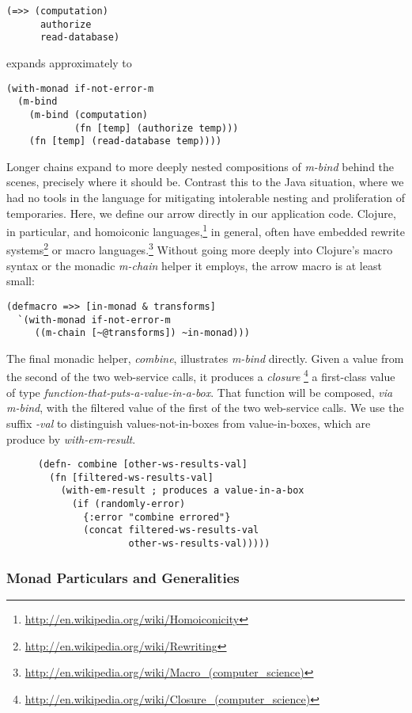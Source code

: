 \documentclass[11pt]{article}
\begin{document}
\begin{verbatim}
(=>> (computation)
      authorize
      read-database)
\end{verbatim}
expands approximately to
\begin{verbatim}
(with-monad if-not-error-m
  (m-bind
    (m-bind (computation)
            (fn [temp] (authorize temp)))
    (fn [temp] (read-database temp))))
\end{verbatim}
Longer chains expand to more deeply nested compositions of \emph{m-bind}
behind the scenes, precisely where it should be. Contrast this to
the Java situation, where we had no tools in the language for
mitigating intolerable nesting and proliferation of temporaries.
Here, we define our arrow directly in our application code.
Clojure, in particular, and homoiconic
languages,\footnote{\url{http://en.wikipedia.org/wiki/Homoiconicity}} in
general, often have embedded rewrite
systems\footnote{\url{http://en.wikipedia.org/wiki/Rewriting}} or macro
languages.\footnote{\url{http://en.wikipedia.org/wiki/Macro_(computer_science)}}
Without going more deeply into Clojure's macro syntax or the
monadic \emph{m-chain} helper it employs, the arrow macro is at least
small:
\begin{verbatim}
(defmacro =>> [in-monad & transforms]
  `(with-monad if-not-error-m
     ((m-chain [~@transforms]) ~in-monad)))
\end{verbatim}

The final monadic helper, \emph{combine}, illustrates \emph{m-bind} directly.
Given a value from the second of the two web-service calls, it
produces a \emph{closure}
\footnote{\url{http://en.wikipedia.org/wiki/Closure_(computer_science)}}
a first-class value of type
\emph{function-that-puts-a-value-in-a-box}. That function
will be composed, \emph{via} \emph{m-bind}, with the filtered value of the first
of the two web-service calls. We use the suffix \emph{-val} to
distinguish values-not-in-boxes from value-in-boxes, which are
produce by \emph{with-em-result}.
\begin{figure}[H]
\label{monadic-helpers-2}
\begin{verbatim}
(defn- combine [other-ws-results-val]
  (fn [filtered-ws-results-val]
    (with-em-result ; produces a value-in-a-box
      (if (randomly-error)
        {:error "combine errored"}
        (concat filtered-ws-results-val
                other-ws-results-val)))))
\end{verbatim}
\end{figure}
\subsubsection{Monad Particulars and Generalities}
\label{sec-3-2-2}
\end{document}
